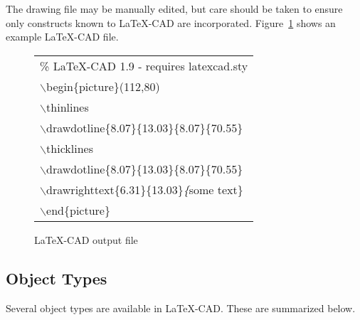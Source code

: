 \documentclass[a4paper]{article}
\newcommand{\bs}{$\backslash$}
\begin{document}
The drawing file may be manually edited, but care should be taken
to ensure only constructs known to LaTeX-CAD are incorporated.
Figure~\ref{fig:lcadfile} shows an example LaTeX-CAD file.


\begin{figure}
	\begin{center}
	\begin{tabular}{l}
		\hline
		\% LaTeX-CAD 1.9 - requires latexcad.sty \\
		\bs begin\{picture\}(112,80)             \\
		\bs thinlines                            \\
		\bs drawdotline\{8.07\}\{13.03\}\{8.07\}\{70.55\} \\
		\bs thicklines                          \\
		\bs drawdotline\{8.07\}\{13.03\}\{8.07\}\{70.55\} \\
		\bs drawrighttext\{6.31\}\{13.03\}\textit\{some text\} \\
		\bs end\{picture\}                      \\
		\hline\hline
	\end{tabular}
	\caption{LaTeX-CAD output file}
	\label{fig:lcadfile}
	\end{center}
\end{figure}
		
\subsection{ Object Types } \label{sec:objecttypes}
Several object types are available in LaTeX-CAD. These are
summarized below.
\end{document}
